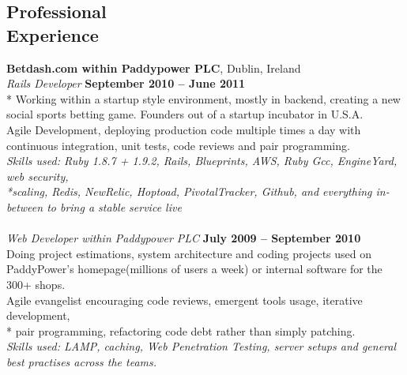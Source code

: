 \documentclass[margin,line]{resume}
\begin{document}
\begin{resume}

    \section{\mysidestyle Professional\\Experience}
    \textbf{Betdash.com within Paddypower PLC}, Dublin, Ireland \vspace{2mm}\\\vspace{1mm}%
    \textsl{Rails Developer} \hfill \textbf{September 2010 -- June 2011}\\*
    Working within a startup style environment, mostly in backend, creating a new social sports betting game. Founders out of a startup incubator in U.S.A. \vspace{1mm}\\%
    Agile Development, deploying production code multiple times a day with continuous integration, unit tests, code reviews and pair programming. \vspace{1mm} \vspace{1mm}\\%
    \textsl{Skills used: Ruby 1.8.7 + 1.9.2, Rails, Blueprints, AWS, Ruby Gcc, EngineYard, web security, \\*scaling, Redis, NewRelic, Hoptoad, PivotalTracker, Github, and everything in-between to bring a stable service live  } \vspace{1mm} \\
    \\ \textsl{Web Developer within Paddypower PLC} \hfill \textbf{July 2009 -- September 2010}\\
    Doing project estimations, system architecture and coding projects used on PaddyPower's homepage(millions of users a week) or internal software for the 300+ shops. \vspace{1mm}\\%
    Agile evangelist encouraging code reviews, emergent tools usage, iterative development, \\* pair programming, refactoring code debt rather than simply patching. \vspace{1mm}\\%
    \textsl{Skills used: LAMP, caching, Web Penetration Testing, server setups and general best practises across the teams. } \vspace{1mm}\\%


\end{resume}
\end{document}
